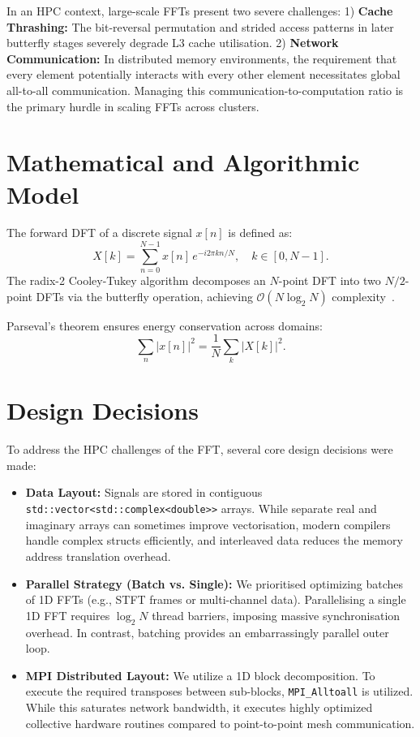 \documentclass[journal]{IEEEtran}
\begin{document}
In an HPC context, large-scale FFTs present two severe challenges:
1) \textbf{Cache Thrashing:} The bit-reversal permutation and strided access patterns in later butterfly stages severely degrade L3 cache utilisation.
2) \textbf{Network Communication:} In distributed memory environments, the requirement that every element potentially interacts with every other element necessitates global all-to-all communication. Managing this communication-to-computation ratio is the primary hurdle in scaling FFTs across clusters.

\section{Mathematical and Algorithmic Model}
The forward DFT of a discrete signal $x[n]$ is defined as:
\begin{equation}
X[k] = \sum_{n=0}^{N-1} x[n]\,e^{-i 2\pi kn/N},\quad k\in[0,N-1].
\label{eq:dft}
\end{equation}
The radix-2 Cooley-Tukey algorithm decomposes an $N$-point DFT into two $N/2$-point DFTs via the butterfly operation, achieving $\mathcal{O}(N\log_2 N)$ complexity~\cite{cooley1965}.

Parseval's theorem ensures energy conservation across domains:
\begin{equation}
\sum_{n}|x[n]|^2 = \frac{1}{N}\sum_{k}|X[k]|^2.
\label{eq:parseval}
\end{equation}

\section{Design Decisions}
To address the HPC challenges of the FFT, several core design decisions were made:
\begin{itemize}
    \item \textbf{Data Layout:} Signals are stored in contiguous \texttt{std::vector<std::complex<double>>} arrays. While separate real and imaginary arrays can sometimes improve vectorisation, modern compilers handle complex structs efficiently, and interleaved data reduces the memory address translation overhead.
    \item \textbf{Parallel Strategy (Batch vs. Single):} We prioritised optimizing batches of 1D FFTs (e.g., STFT frames or multi-channel data). Parallelising a single 1D FFT requires $\log_2 N$ thread barriers, imposing massive synchronisation overhead. In contrast, batching provides an embarrassingly parallel outer loop.
    \item \textbf{MPI Distributed Layout:} We utilize a 1D block decomposition. To execute the required transposes between sub-blocks, \texttt{MPI\_Alltoall} is utilized. While this saturates network bandwidth, it executes highly optimized collective hardware routines compared to point-to-point mesh communication.
\end{itemize}
\end{document}
